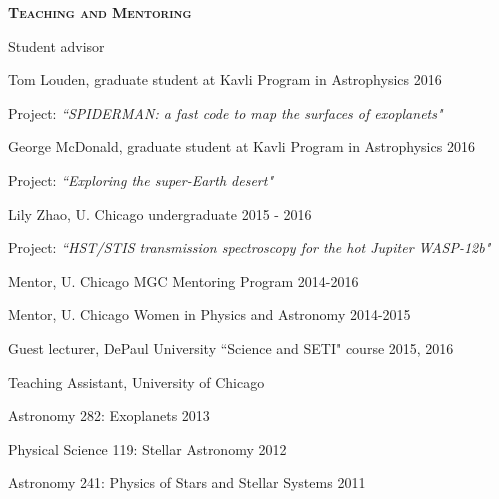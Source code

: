 \documentclass[12pt,letterpaper]{article}
\begin{document}
\vspace{7mm}
\textbf{\textsc{Teaching and Mentoring}} 
\begin{compactitem}[]
\item Student advisor
	\begin{compactitem}
	\item Tom Louden, graduate student at Kavli Program in Astrophysics \hfill 2016 
		\begin{sloppypar}
		Project: \textit{``SPIDERMAN: a fast code to map the surfaces of exoplanets"}
		\end{sloppypar}
	\item George McDonald, graduate student at Kavli Program in Astrophysics \hfill 2016
		\begin{sloppypar}
		Project: \textit{``Exploring the super-Earth desert"}
		\end{sloppypar}
	\item Lily Zhao, U. Chicago undergraduate \hfill 2015 - 2016
		\begin{sloppypar}
		Project: \textit{``HST/STIS transmission spectroscopy for the hot Jupiter WASP-12b"}
		\end{sloppypar}
	\end{compactitem}
\item Mentor, U. Chicago MGC Mentoring Program \hfill 2014-2016 
\item Mentor, U. Chicago Women in Physics and Astronomy \hfill2014-2015
\item Guest lecturer, DePaul University ``Science and SETI" course \hfill2015, 2016
\item Teaching Assistant, University of Chicago
	\begin{compactitem}
	\item Astronomy 282:  Exoplanets \hfill 2013
	\item Physical Science 119:  Stellar Astronomy	\hfill 2012
	\item Astronomy 241:  Physics of Stars and Stellar Systems \hfill	2011 
	\end{compactitem}
\end{compactitem}
\end{document}
